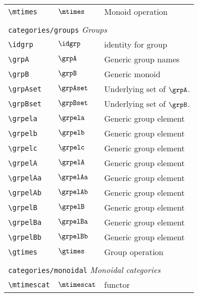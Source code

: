 \begin{longtable}{lll}
 {\color[rgb]{0.5,0.5,0.5}\texttt{\textbackslash mtimes}} & $\mtimes$ &  Monoid operation\\ 
  &  & \\ 
 \multicolumn{3}{l}{{\color[rgb]{0.5,0.5,0.5}\texttt{categories/groups}} \emph{Groups}}\\ 
 \hline
{\color[rgb]{0.5,0.5,0.5}\texttt{\textbackslash idgrp}} & $\idgrp$ &  identity for group\\ 
 {\color[rgb]{0.5,0.5,0.5}\texttt{\textbackslash grpA}} & $\grpA$ &  Generic group names\\ 
 {\color[rgb]{0.5,0.5,0.5}\texttt{\textbackslash grpB}} & $\grpB$ &  Generic monoid\\ 
 {\color[rgb]{0.5,0.5,0.5}\texttt{\textbackslash grpAset}} & $\grpAset$ &  Underlying set of $\grpA$.\\ 
 {\color[rgb]{0.5,0.5,0.5}\texttt{\textbackslash grpBset}} & $\grpBset$ &  Underlying set of $\grpB$.\\ 
 {\color[rgb]{0.5,0.5,0.5}\texttt{\textbackslash grpela}} & $\grpela$ &  Generic group element\\ 
 {\color[rgb]{0.5,0.5,0.5}\texttt{\textbackslash grpelb}} & $\grpelb$ &  Generic group element\\ 
 {\color[rgb]{0.5,0.5,0.5}\texttt{\textbackslash grpelc}} & $\grpelc$ &  Generic group element\\ 
 {\color[rgb]{0.5,0.5,0.5}\texttt{\textbackslash grpelA}} & $\grpelA$ &  Generic group element\\ 
 {\color[rgb]{0.5,0.5,0.5}\texttt{\textbackslash grpelAa}} & $\grpelAa$ &  Generic group element\\ 
 {\color[rgb]{0.5,0.5,0.5}\texttt{\textbackslash grpelAb}} & $\grpelAb$ &  Generic group element\\ 
 {\color[rgb]{0.5,0.5,0.5}\texttt{\textbackslash grpelB}} & $\grpelB$ &  Generic group element\\ 
 {\color[rgb]{0.5,0.5,0.5}\texttt{\textbackslash grpelBa}} & $\grpelBa$ &  Generic group element\\ 
 {\color[rgb]{0.5,0.5,0.5}\texttt{\textbackslash grpelBb}} & $\grpelBb$ &  Generic group element\\ 
 {\color[rgb]{0.5,0.5,0.5}\texttt{\textbackslash gtimes}} & $\gtimes$ &  Group operation\\ 
  &  & \\ 
 \multicolumn{3}{l}{{\color[rgb]{0.5,0.5,0.5}\texttt{categories/monoidal}} \emph{Monoidal categories}}\\ 
 \hline
{\color[rgb]{0.5,0.5,0.5}\texttt{\textbackslash mtimescat}} & $\mtimescat$ &  functor\\ 

\end{longtable}
